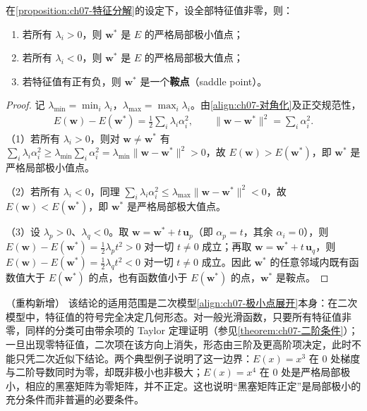 \documentclass[../../main.tex]{subfiles}
\begin{document}
\begin{proposition}[驻点类型与特征值符号]\label{proposition:ch07-驻点分类}
在\cref{proposition:ch07-特征分解}的设定下，设全部特征值非零，则：
\begin{enumerate}
\item 若所有 $\lambda_i>0$，则 $\mathbf{w}^{\ast}$ 是 $E$ 的严格局部极小值点；
\item 若所有 $\lambda_i<0$，则 $\mathbf{w}^{\ast}$ 是 $E$ 的严格局部极大值点；
\item 若特征值有正有负，则 $\mathbf{w}^{\ast}$ 是一个\textbf{鞍点}（saddle point）。
\end{enumerate}
\end{proposition}
\begin{proof}
记 $\lambda_{\min}=\min_i\lambda_i$，$\lambda_{\max}=\max_i\lambda_i$。由\eqref{align:ch07-对角化}及正交规范性，
\begin{align*}
E(\mathbf{w})-E(\mathbf{w}^{\ast})=\frac{1}{2}\sum_i\lambda_i\alpha_i^{2},\qquad
\|\mathbf{w}-\mathbf{w}^{\ast}\|^{2}=\sum_i\alpha_i^{2}.
\end{align*}
（1）若所有 $\lambda_i>0$，则对 $\mathbf{w}\neq\mathbf{w}^{\ast}$ 有 $\sum_i\lambda_i\alpha_i^{2}\geqslant\lambda_{\min}\sum_i\alpha_i^{2}=\lambda_{\min}\|\mathbf{w}-\mathbf{w}^{\ast}\|^{2}>0$，故 $E(\mathbf{w})>E(\mathbf{w}^{\ast})$，即 $\mathbf{w}^{\ast}$ 是严格局部极小值点。

（2）若所有 $\lambda_i<0$，同理 $\sum_i\lambda_i\alpha_i^{2}\leqslant\lambda_{\max}\|\mathbf{w}-\mathbf{w}^{\ast}\|^{2}<0$，故 $E(\mathbf{w})<E(\mathbf{w}^{\ast})$，即 $\mathbf{w}^{\ast}$ 是严格局部极大值点。

（3）设 $\lambda_p>0$、$\lambda_q<0$。取 $\mathbf{w}=\mathbf{w}^{\ast}+t\,\mathbf{u}_p$（即 $\alpha_p=t$，其余 $\alpha_i=0$），则 $E(\mathbf{w})-E(\mathbf{w}^{\ast})=\frac{1}{2}\lambda_pt^{2}>0$ 对一切 $t\neq0$ 成立；再取 $\mathbf{w}=\mathbf{w}^{\ast}+t\,\mathbf{u}_q$，则 $E(\mathbf{w})-E(\mathbf{w}^{\ast})=\frac{1}{2}\lambda_qt^{2}<0$ 对一切 $t\neq0$ 成立。因此 $\mathbf{w}^{\ast}$ 的任意邻域内既有函数值大于 $E(\mathbf{w}^{\ast})$ 的点，也有函数值小于 $E(\mathbf{w}^{\ast})$ 的点，$\mathbf{w}^{\ast}$ 是鞍点。
\end{proof}

\begin{remark}（重构新增）
该结论的适用范围是二次模型\eqref{align:ch07-极小点展开}本身：在二次模型中，特征值的符号完全决定几何形态。对一般光滑函数，只要所有特征值非零，同样的分类可由带余项的 Taylor 定理证明（参见\cref{theorem:ch07-二阶条件}）；一旦出现零特征值，二次项在该方向上消失，形态由三阶及更高阶项决定，此时不能只凭二次近似下结论。两个典型例子说明了这一边界：$E(x)=x^{3}$ 在 $0$ 处梯度与二阶导数同时为零，却既非极小也非极大；$E(x)=x^{4}$ 在 $0$ 处是严格局部极小，相应的黑塞矩阵为零矩阵，并不正定。这也说明“黑塞矩阵正定”是局部极小的充分条件而非普遍的必要条件。
\end{remark}
\end{document}
